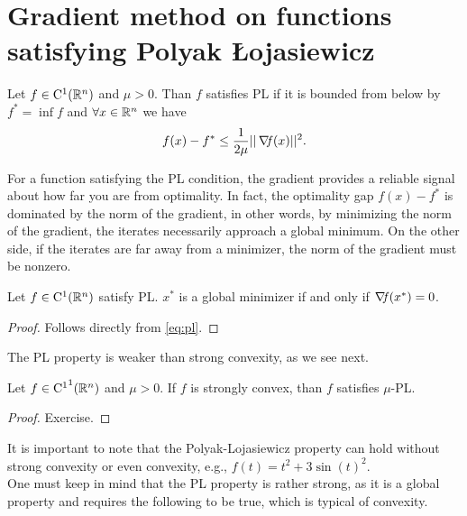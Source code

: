 \documentclass[10pt,a4paper]{article}
\begin{document}
\section{Gradient method on functions satisfying Polyak \L ojasiewicz}
\begin{definition} Let $f\in \mathord{\mathrm{C^1}}(\mathbb{R}^n)$ and $\mu>0$. Than $f$ satisfies PL if it is bounded from below by $f^*=\inf f$ and $\forall x\in \mathbb{R}^n$ we have 
\begin{equation}\label{eq:pl}
	f(x) - f^* \leq \frac{1}{2\mu} ||\operatorname*{\mathit{\nabla \!f}}(x)||^2.
\end{equation}
\end{definition}
\noindent For a function satisfying the PL condition, the gradient provides a reliable signal about how far you are from optimality. In fact, the optimality gap $f(x) - f^*$ is dominated by the norm of the gradient, in other words, by minimizing the norm of the gradient, the iterates necessarily approach a global minimum. On the other side, if the iterates are far away from a minimizer, the norm of the gradient must be nonzero. 
\begin{lemma}
	Let $f\in \mathord{\mathrm{C^1}}(\mathbb{R}^n)$ satisfy PL. $x^*$ is a global minimizer if and only if $\operatorname*{\mathit{\nabla \!f}}(x^*)=0$.
\end{lemma}
\begin{proof}
	Follows directly from \eqref{eq:pl}.
\end{proof}
\noindent The PL property is weaker than strong convexity, as we see next.
\begin{lemma}
	Let $f\in \mathord{\mathrm{C^1}}^1(\mathbb{R}^n)$ and $\mu>0$. If $f$ is strongly convex, than $f$ satisfies $\mu$-PL.
\end{lemma}
\begin{proof}
	Exercise.
\end{proof}
It is important to note that the Polyak-Lojasiewicz property can hold without strong convexity
or even convexity, e.g., $f(t)=t^2+3\sin(t)^2$.\\
One must keep in mind that the PL property is rather strong, as it is a global property and
requires the following to be true, which is typical of convexity.
\end{document}
